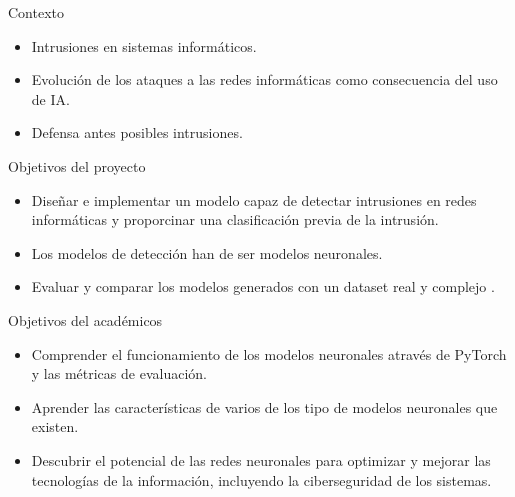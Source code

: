 
\begin{frame}{Contexto}
    \begin{itemize}
    		\item Intrusiones en sistemas informáticos.
        \vspace{10mm}
        \item Evolución de los ataques a las redes informáticas como consecuencia del uso de IA.
        \vspace{10mm}
        \item Defensa antes posibles intrusiones.
    \end{itemize}
\end{frame}


\begin{frame}{Objetivos del proyecto}
    \begin{itemize}
        \item  Diseñar e implementar un modelo capaz de detectar intrusiones en redes informáticas y proporcinar una clasificación previa de la intrusión.
        \vspace{10mm}
        \item Los modelos de detección han de ser modelos neuronales.
        \vspace{10mm}
        \item Evaluar y comparar los modelos generados con un dataset real y complejo .
    \end{itemize}
\end{frame}

\begin{frame}{Objetivos del académicos}
    \begin{itemize}
        \item Comprender el funcionamiento de los modelos neuronales através de PyTorch y las métricas de evaluación.
        \vspace{10mm}
        \item Aprender las características de varios de los tipo de modelos neuronales que existen.
        \vspace{10mm}
        \item Descubrir el potencial de las redes neuronales para optimizar y mejorar las tecnologías de la información, incluyendo la ciberseguridad de los sistemas.
        \end{itemize}
\end{frame}
